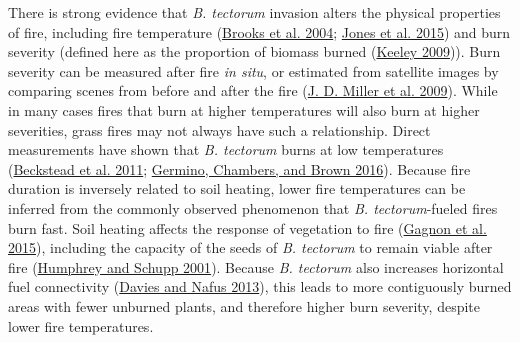 \documentclass[
  12pt,
]{article}
\begin{document}
There is strong evidence that \emph{B. tectorum} invasion alters the
physical properties of fire, including fire temperature
(\protect\hyperlink{ref-Brooks2004}{Brooks et al. 2004};
\protect\hyperlink{ref-Jones2015}{Jones et al. 2015}) and burn severity
(defined here as the proportion of biomass burned
(\protect\hyperlink{ref-Keeley2009}{Keeley 2009})). Burn severity can be
measured after fire \emph{in situ}, or estimated from satellite images
by comparing scenes from before and after the fire
(\protect\hyperlink{ref-Miller2009}{J. D. Miller et al. 2009}). While in
many cases fires that burn at higher temperatures will also burn at
higher severities, grass fires may not always have such a relationship.
Direct measurements have shown that \emph{B. tectorum} burns at low
temperatures (\protect\hyperlink{ref-Beckstead2011}{Beckstead et al.
2011}; \protect\hyperlink{ref-Germino2016}{Germino, Chambers, and Brown
2016}). Because fire duration is inversely related to soil heating,
lower fire temperatures can be inferred from the commonly observed
phenomenon that \emph{B. tectorum}-fueled fires burn fast. Soil heating
affects the response of vegetation to fire
(\protect\hyperlink{ref-Gagnon2015}{Gagnon et al. 2015}), including the
capacity of the seeds of \emph{B. tectorum} to remain viable after fire
(\protect\hyperlink{ref-Humphrey2001}{Humphrey and Schupp 2001}).
Because \emph{B. tectorum} also increases horizontal fuel connectivity
(\protect\hyperlink{ref-Davies2013}{Davies and Nafus 2013}), this leads
to more contiguously burned areas with fewer unburned plants, and
therefore higher burn severity, despite lower fire temperatures.
\end{document}
